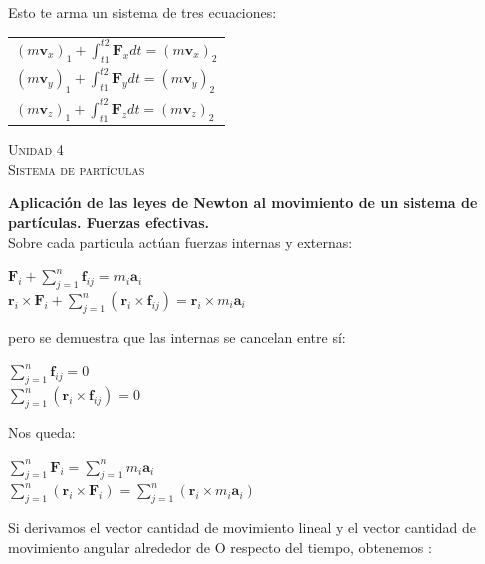 \documentclass[11pt,a4paper,twocolumn]{article}
\newcommand{\unidad}[2]{\begin{center}
		\fontsize{10}{10}\selectfont\color{gray!50!black}\scshape Unidad #1 \\
		\fontsize{14}{14}\selectfont \scshape #2
		
\end{center}}
\newcommand{\vc}[1]{\textbf{#1}}
\begin{document}
	Esto te arma un sistema de tres ecuaciones:\\
	\begin{tcolorbox}	
		\begin{tabular}{l}
			$(m\vc{v}_{x})_{1}+\int_{t1}^{t2} \vc{F}_{x} dt=(m\vc{v}_{x})_{2}$\\
			$(m\vc{v}_{y})_{1}+\int_{t1}^{t2} \vc{F}_{y} dt=(m\vc{v}_{y})_{2}$\\
			$(m\vc{v}_{z})_{1}+\int_{t1}^{t2} \vc{F}_{z} dt=(m\vc{v}_{z})_{2}$\\
		\end{tabular}
	\end{tcolorbox}

	\unidad{4}{Sistema de partículas}
	\textbf{Aplicación de las leyes de Newton al movimiento de un sistema de partículas. Fuerzas efectivas.}\\
	Sobre cada particula actúan fuerzas internas y externas:
	\begin{center}
			$\vc{F}_{i}+\sum_{j=1}^{n} \vc{f}_{ij}=m_{i}\vc{a}_{i}$\\
			\vspace{0.2cm}
			$\vc{r}_{i}\times\vc{F}_{i}+\sum_{j=1}^{n}(\vc{r}_{i}\times \vc{f}_{ij})=\vc{r}_{i}\times m_{i}\vc{a}_{i}$\\		
	\end{center}
	
	 pero se demuestra que las internas se cancelan entre sí:
	 \begin{center}
	 	$\sum_{j=1}^{n} \vc{f}_{ij}=0$\\
	 	\vspace{0.2cm}
	 	$\sum_{j=1}^{n}(\vc{r}_{i}\times \vc{f}_{ij})=0$\\		
	 \end{center}
	
	Nos queda:
	\begin{tcolorbox}
	\begin{center}
		$\sum_{j=1}^{n}\vc{F}_{i}=\sum_{j=1}^{n} m_{i}\vc{a}_{i}$\\
		\vspace{0.2cm}
		$\sum_{j=1}^{n}(\vc{r}_{i}\times\vc{F}_{i})=\sum_{j=1}^{n}(\vc{r}_{i}\times m_{i}\vc{a}_{i})$\\		
	\end{center}	
	\end{tcolorbox}

	Si derivamos el vector cantidad de movimiento lineal y el vector cantidad de movimiento angular alrededor de O respecto del tiempo, obtenemos :\\
	
\end{document}
